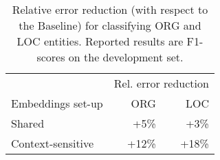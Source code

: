 \documentclass[../report.tex]{subfiles}
\begin{document}
\begin{table}[t]
\centering
{
\begin{tabular}{@{}lrr@{}}
\toprule
                         & \multicolumn{2}{c}{Rel. error reduction} \\ \cmidrule{2-3}
Embeddings set-up        & ORG        & LOC      \\ \midrule
Shared                   & +5\%       & +3\%     \\ 
Context-sensitive        & +12\%      & +18\%    \\
\bottomrule
\end{tabular}
}
\caption{
    Relative error reduction (with respect to the Baseline) for classifying ORG and LOC entities.
    Reported results are F1-scores on the development set.
}
\label{table:errors}
\end{table}
\end{document}
